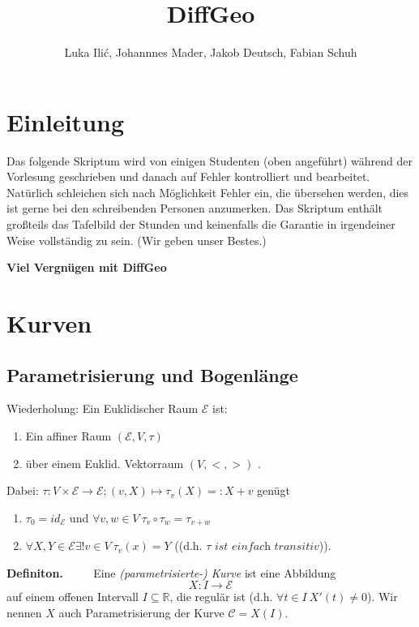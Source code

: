 \documentclass[a4paper,oneside,11pt,DIV=12,parskip=half]{scrartcl}
\title{DiffGeo}
\author{ Luka Ili\'{c}, Johannnes Mader, Jakob Deutsch, Fabian Schuh}
\newcommand{\R}{\mathbb R}
\newenvironment{definition}{\textbf{Definiton.} ~~~~}{}
\newenvironment{lemma, definition}{\textbf{Lemma und Definition.} ~~~~}{}
\newenvironment{note, example}{\textbf{Bemerkung und Beispiel.} ~~~~}{}
\begin{document}
	
	\maketitle
	
	\pagebreak
	
	\tableofcontents
	
	\pagebreak
	
\section*{Einleitung}
Das folgende Skriptum wird von einigen Studenten (oben angeführt) während der Vorlesung geschrieben und danach auf Fehler kontrolliert und bearbeitet. Natürlich schleichen sich nach Möglichkeit Fehler ein, die übersehen werden, dies ist gerne bei den schreibenden Personen anzumerken.
Das Skriptum enthält großteils das Tafelbild der Stunden und keinenfalls die Garantie in irgendeiner Weise vollständig zu sein. (Wir geben unser Bestes.)

\textbf{Viel Vergnügen mit DiffGeo}
\pagebreak
	
\section{Kurven}
\subsection{Parametrisierung und Bogenlänge}

Wiederholung: Ein Euklidischer Raum $\mathcal{E}$ ist:
\begin{enumerate}
	\item Ein affiner Raum $(\mathcal{E},V,\tau)$ 
	\item über einem Euklid. Vektorraum $(V,<,>)$ .
\end{enumerate}

	Dabei: $\tau: V\times \mathcal{E} \rightarrow \mathcal{E}; (v,X) \mapsto \tau_v(X)=:X+v$ genügt
	\begin{enumerate}
		\item $\tau_0 = id_{\mathcal{E}}$ und $\forall v,w \in V ~ \tau_v \circ \tau_w = \tau_{v+w}$
		\item $\forall X,Y \in \mathcal{E} \exists! v \in V ~ \tau_v(x) = Y$ ((d.h. $\tau  \textit{ ist einfach transitiv}$)).
	\end{enumerate}
	
	
\begin{definition}
	Eine \textit{(parametrisierte-) Kurve} ist eine Abbildung \[X: I \rightarrow \mathcal{E}\] auf einem offenen Intervall $I \subseteq \R$, die regulär ist (d.h. $\forall t \in I ~ X'(t) \not = 0$).
	Wir nennen $X$ auch Parametrisierung der Kurve $\mathcal{C} = X(I)$.
\end{definition}
\end{document}
